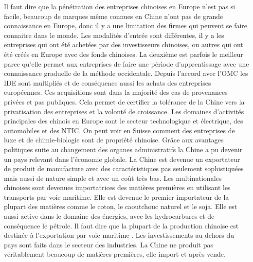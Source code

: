 Il faut dire que la pénétration des entreprises chinoises en Europe n’est pas si facile, beaucoup de marques même connues en Chine n’ont pas de grande connaissance en Europe, donc il y a une limitation des firmes qui peuvent se faire connaitre dans le monde.
Les modalités d’entrée sont différentes, il y a les entreprises qui ont été achetées par des investisseurs chinoises, ou autres qui ont été créés en Europe avec des fonds chinoises. La deuxième est parfois le meilleur parce qu’elle permet aux entreprises de faire une période d’apprentissage avec une connaissance graduelle de la méthode occidentale.
Depuis l’accord avec l’OMC les IDE sont multipliés et de conséquence aussi les achats des entreprises européennes. Ces acquisitions sont dans la majorité des cas de provenances privées et pas publiques. Cela permet de certifier la tolérance de la Chine vers la privatisation des entreprises et la volonté de croissance. 
Les domaines d’activités principales des chinois en Europe sont le secteur technologique et électrique, des automobiles et des NTIC. On peut voir en Suisse comment des entreprises de luxe et de chimie-biologie sont de propriété chinoise.
Grâce aux avantages politiques suite au changement des organes administratifs la Chine a pu devenir un pays relevant dans l’économie globale. La Chine est devenue un exportateur de produit de manufacture avec des caractéristiques pas seulement sophistiquées mais aussi de nature simple et avec un coût très bas.   
Les multinationales chinoises sont devenues importatrices des matières premières en utilisant les transports par voie maritime. Elle est devenue le premier importateur de la plupart des matières comme le coton, le caoutchouc naturel et le soja. 
Elle est aussi active dans le domaine des énergies, avec les hydrocarbures et de conséquence le pétrole.
Il faut dire que la plupart de la production chinoise est destinée à l’exportation par voie maritime . Les investissements au dehors du pays sont faits dans le secteur des industries. 
La Chine ne produit pas véritablement beaucoup de matières premières, elle import et après vende. 

